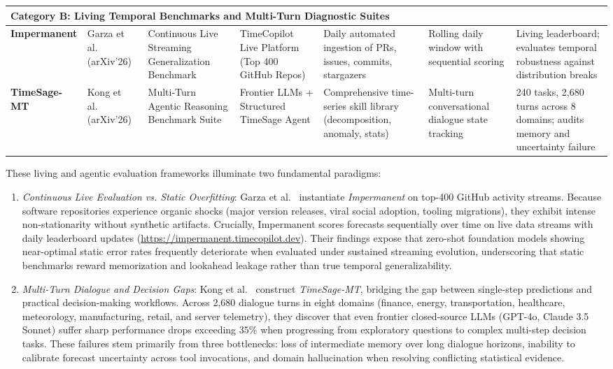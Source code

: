 \begin{table}[t]
{\begin{tabular}{lp{2.2cm}p{3.2cm}p{3.0cm}p{3.2cm}p{3.0cm}p{3.8cm}}
\midrule
\multicolumn{7}{l}{\textbf{Category B: Living Temporal Benchmarks and Multi-Turn Diagnostic Suites}} \\
\midrule
\textbf{Impermanent} & Garza et al.~\cite{garza2026impermanent} (arXiv'26) & Continuous Live Streaming Generalization Benchmark & TimeCopilot Live Platform (Top 400 GitHub Repos) & Daily automated ingestion of PRs, issues, commits, stargazers & Rolling daily window with sequential scoring & Living leaderboard; evaluates temporal robustness against distribution breaks \\
\midrule
\textbf{TimeSage-MT} & Kong et al.~\cite{kong2026timesagemt} (arXiv'26) & Multi-Turn Agentic Reasoning Benchmark Suite & Frontier LLMs + Structured TimeSage Agent & Comprehensive time-series skill library (decomposition, anomaly, stats) & Multi-turn conversational dialogue state tracking & 240 tasks, 2,680 turns across 8 domains; audits memory and uncertainty failure \\
\bottomrule
\end{tabular}
}
\end{table}

These living and agentic evaluation frameworks illuminate two fundamental paradigms:
\begin{enumerate}[leftmargin=*]
    \item \emph{Continuous Live Evaluation vs. Static Overfitting}: Garza et al.~\cite{garza2026impermanent} instantiate \emph{Impermanent} on top-400 GitHub activity streams. Because software repositories experience organic shocks (major version releases, viral social adoption, tooling migrations), they exhibit intense non-stationarity without synthetic artifacts. Crucially, Impermanent scores forecasts sequentially over time on live data streams with daily leaderboard updates (\url{https://impermanent.timecopilot.dev}). Their findings expose that zero-shot foundation models showing near-optimal static error rates frequently deteriorate when evaluated under sustained streaming evolution, underscoring that static benchmarks reward memorization and lookahead leakage rather than true temporal generalizability.
    \item \emph{Multi-Turn Dialogue and Decision Gaps}: Kong et al.~\cite{kong2026timesagemt} construct \emph{TimeSage-MT}, bridging the gap between single-step predictions and practical decision-making workflows. Across 2,680 dialogue turns in eight domains (finance, energy, transportation, healthcare, meteorology, manufacturing, retail, and server telemetry), they discover that even frontier closed-source LLMs (GPT-4o, Claude 3.5 Sonnet) suffer sharp performance drops exceeding $35\%$ when progressing from exploratory questions to complex multi-step decision tasks. These failures stem primarily from three bottlenecks: loss of intermediate memory over long dialogue horizons, inability to calibrate forecast uncertainty across tool invocations, and domain hallucination when resolving conflicting statistical evidence.
\end{enumerate}

